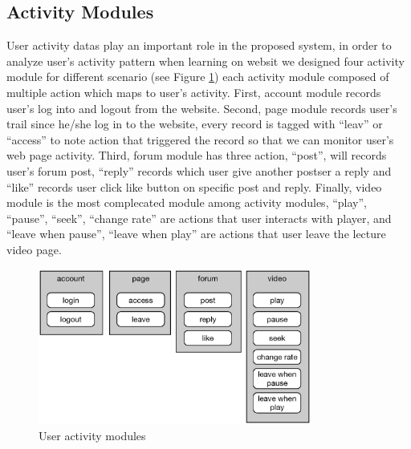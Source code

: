 \subsection{Activity Modules}
User activity datas play an important role in the proposed system, in order to analyze user's activity pattern when learning on websit we designed four activity module for different scenario (see Figure \ref{fig:act-module}) each activity module composed of multiple action which maps to user's activity.
First, account module records user's log into and logout from the website.
Second, page module records user's trail since he/she log in to the website, every record is tagged with ``leav'' or ``access'' to note action that triggered the record so that we can monitor user's web page activity.
Third, forum module has three action, ``post'', will records user's forum post, ``reply'' records which user give another postser a reply and ``like'' records user click like button on specific post and reply.
Finally, video module is the most complecated module among activity modules, ``play'', ``pause'', ``seek'', ``change rate'' are actions that user interacts with player, and ``leave when pause'', ``leave when play'' are actions that user leave the lecture video page.
\begin{figure}[H]
    \centering
    \includegraphics[width = 0.8\textwidth]{fig/activity-module.eps}
    \caption{User activity modules}
    \label{fig:act-module}
\end{figure}

